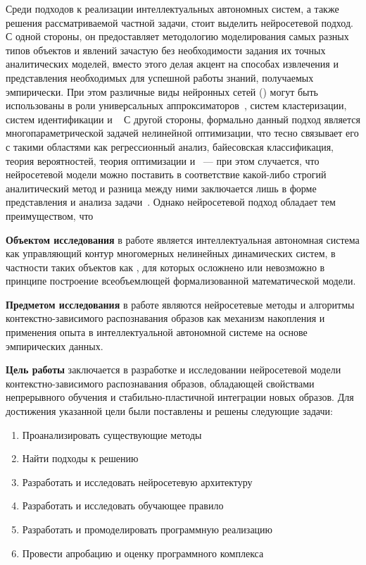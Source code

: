 Среди подходов к реализации интеллектуальных автономных систем, а также решения рассматриваемой частной задачи, стоит выделить нейросетевой подход. С одной стороны, он предоставляет методологию моделирования самых разных типов объектов и явлений зачастую без необходимости задания их точных аналитических моделей, вместо этого делая акцент на способах извлечения и представления необходимых для успешной работы знаний, получаемых эмпирически. При этом различные виды нейронных сетей () могут быть использованы в роли универсальных аппроксиматоров~\cite{Cybenko1989}, систем кластеризации, систем идентификации и \etc~\cite{Haykin2008} С другой стороны, формально данный подход является многопараметрической задачей нелинейной оптимизации, что тесно связывает его с такими областями как регрессионный анализ, байесовская классификация, теория вероятностей, теория оптимизации и \other~--- при этом случается, что нейросетевой модели можно поставить в соответствие какой-либо строгий аналитический метод и разница между ними заключается лишь в форме представления и анализа задачи~\cite{Vorontsov2015-SHAD}. Однако нейросетевой подход обладает тем преимуществом, что


\textbf{Объектом исследования} в работе является интеллектуальная автономная система как управляющий контур многомерных нелинейных динамических систем, в частности таких объектов как , для которых осложнено или невозможно в принципе построение всеобъемлющей формализованной математической модели.

\textbf{Предметом исследования} в работе являются нейросетевые методы и алгоритмы контекстно-зависимого распознавания образов как механизм накопления и применения опыта в интеллектуальной автономной системе на основе эмпирических данных.

\textbf{Цель работы} заключается в разработке и исследовании нейросетевой модели контекстно-зависимого распознавания образов, обладающей свойствами непрерывного обучения и стабильно-пластичной интеграции новых образов. Для достижения указанной цели были поставлены и решены следующие задачи:
\begin{enumerate}[label=\arabic*)]
    \item Проанализировать существующие методы
    \item Найти подходы к решению
    \item Разработать и исследовать нейросетевую архитектуру
    \item Разработать и исследовать обучающее правило
    \item Разработать и промоделировать программную реализацию
    \item Провести апробацию и оценку программного комплекса
\end{enumerate}

